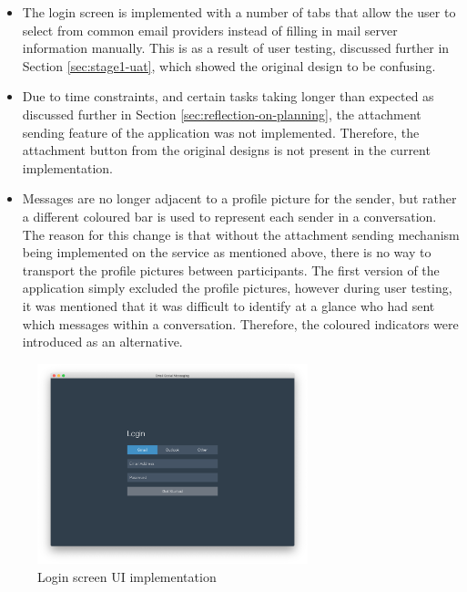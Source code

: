 \begin{itemize}
  \item The login screen is implemented with a number of tabs that allow the user to select from common email providers instead of filling in mail server information manually. This is as a result of user testing, discussed further in Section \ref{sec:stage1-uat}, which showed the original design to be confusing.
  \item Due to time constraints, and certain tasks taking longer than expected as discussed further in Section \ref{sec:reflection-on-planning}, the attachment sending feature of the application was not implemented. Therefore, the attachment button from the original designs is not present in the current implementation.
  \item Messages are no longer adjacent to a profile picture for the sender, but rather a different coloured bar is used to represent each sender in a conversation. The reason for this change is that without the attachment sending mechanism being implemented on the service as mentioned above, there is no way to transport the profile pictures between participants. The first version of the application simply excluded the profile pictures, however during user testing, it was mentioned that it was difficult to identify at a glance who had sent which messages within a conversation. Therefore, the coloured indicators were introduced as an alternative.
\end{itemize}

\begin{figure}[h!]
  \centering
  \includegraphics[width=0.7\textwidth]{images/implementation-login.png}
  \caption{Login screen UI implementation}
  \label{fig:main-ui}
\end{figure}

